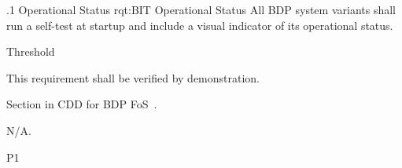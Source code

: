 \ONERQMTVKSA
{\RqtNumberBase.1}
{\BIT Operational Status}
{rqt:BIT Operational Status}
{All BDP system variants shall run a self-test at startup and include a visual indicator of its operational status.}%
{
	\item [Phase 1] Threshold
}
{This requirement shall be verified by demonstration.}
{
\item [5.5.15.1] Section in CDD for BDP FoS~\cite{ref__BDP_FOS_CDD}.
}
{
  \item N/A.
}
{P1}


